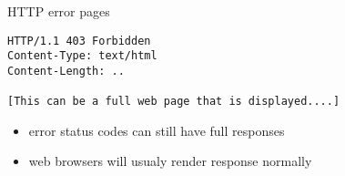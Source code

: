 \begin{frame}[fragile]{HTTP error pages}
\begin{Verbatim}
HTTP/1.1 403 Forbidden
Content-Type: text/html
Content-Length: ..

[This can be a full web page that is displayed....]
\end{Verbatim}
\begin{itemize}
    \item error status codes can still have full responses
    \item web browsers will usualy render response normally
    \end{itemize}
\end{frame}
